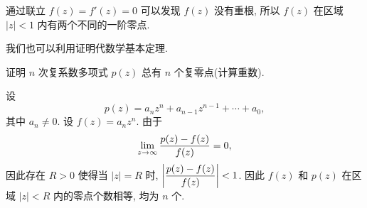 通过联立 $f(z)=f'(z)=0$ 可以发现 $f(z)$ 没有重根, 所以 $f(z)$ 在区域 $|z|<1$ 内有两个不同的一阶零点.

我们也可以利用\thmRouche 证明代数学基本定理.
\begin{example}[代数学基本定理]
	证明 $n$ 次复系数多项式 $p(z)$ 总有 $n$ 个复零点(计算重数).
\end{example}

\begin{solution}
  设
  \[
    p(z)=a_nz^n+a_{n-1}z^{n-1}+\cdots+a_0,
  \]
  其中 $a_n\neq 0$.
  设 $f(z)=a_n z^n$.
  由于
  \[
    \lim_{z\rightarrow\infty}\frac{p(z)-f(z)}{f(z)}=0,
  \]
  因此存在 $R>0$ 使得当 $|z|=R$ 时, $\left|\dfrac{p(z)-f(z)}{f(z)}\right|<1$.
  因此 $f(z)$ 和 $p(z)$ 在区域 $|z|<R$ 内的零点个数相等, 均为 $n$ 个.
\end{solution}





